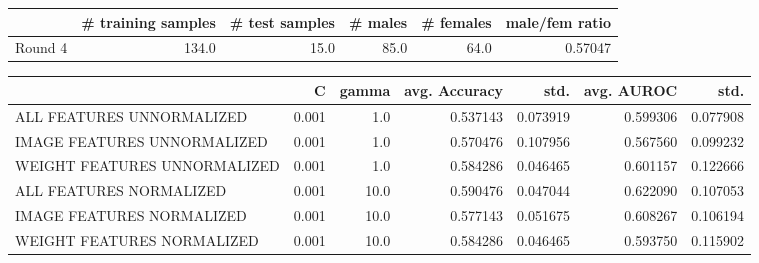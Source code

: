 \begin{tabular}{lrrrrr}
\hline
{} &  \# training samples &  \# test samples &  \# males &  \# females &  male/fem ratio \\
\hline
Round 4 &               134.0 &            15.0 &     85.0 &       64.0 &         0.57047 \\
\hline
\end{tabular}
\begin{tabular}{lrrrrrr}
\hline
{} &      C &  gamma &  avg. Accuracy &      std. &  avg. AUROC &      std. \\
\hline
ALL FEATURES UNNORMALIZED    &  0.001 &    1.0 &       0.537143 &  0.073919 &    0.599306 &  0.077908 \\
IMAGE FEATURES UNNORMALIZED  &  0.001 &    1.0 &       0.570476 &  0.107956 &    0.567560 &  0.099232 \\
WEIGHT FEATURES UNNORMALIZED &  0.001 &    1.0 &       0.584286 &  0.046465 &    0.601157 &  0.122666 \\
ALL FEATURES NORMALIZED      &  0.001 &   10.0 &       0.590476 &  0.047044 &    0.622090 &  0.107053 \\
IMAGE FEATURES NORMALIZED    &  0.001 &   10.0 &       0.577143 &  0.051675 &    0.608267 &  0.106194 \\
WEIGHT FEATURES NORMALIZED   &  0.001 &   10.0 &       0.584286 &  0.046465 &    0.593750 &  0.115902 \\
\hline
\end{tabular}
